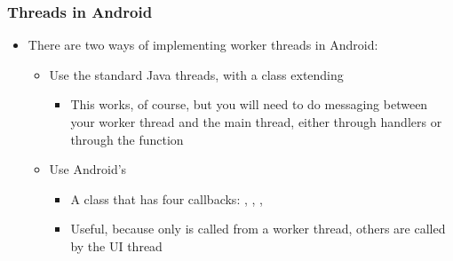 \begin{frame}
  \frametitle{Threads in Android}
  \begin{itemize}
  \item There are two ways of implementing worker threads in Android:
    \begin{itemize}
    \item Use the standard Java threads, with a class extending
      \begin{itemize}
      \item This works, of course, but you will need to do messaging
        between your worker thread and the main thread, either through
        handlers or through the  function
      \end{itemize}
    \item Use Android's 
      \begin{itemize}
      \item A class that has four callbacks: ,
        , ,
      \item Useful, because only  is called from
        a worker thread, others are called by the UI thread
      \end{itemize}
    \end{itemize}
  \end{itemize}
\end{frame}

